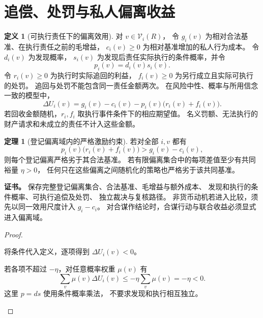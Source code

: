 \documentclass[UTF8,12pt,a4paper,openany,fontset=none,zihao=false]{ctexrep}
\theoremstyle{definition}
\newtheorem{definition}{定义}[chapter]
\newtheorem{theorem}{定理}[chapter]
\newenvironment{certificate}{\par\noindent\textbf{证书。}\ignorespaces}{\par}
\newcommand{\1}{\mathbf 1}
\begin{document}
\section{追偿、处罚与私人偏离收益}

\begin{definition}[可执行责任下的偏离效用]
\label{inc:def-utility}
对 \(v\in\mathcal V_i(R)\)，
令 \(g_i(v)\) 为相对合法基准、在执行责任之前的毛增益，
\(c_i(v)\ge0\) 为相对基准增加的私人行为成本。
令 \(d_i(v)\) 为发现概率，
\(s_i(v)\) 为发现后责任实际执行的条件概率，并令
\[
 p_i(v)=d_i(v)s_i(v).
\]
令 \(r_i(v)\ge0\) 为执行时实际追回的利益，
\(f_i(v)\ge0\) 为另行成立且实际可执行的处罚。
追回与处罚不能包含同一责任金额两次。
在风险中性、概率与所用信念一致的模型中，
\[
 \Delta U_i(v)
 =g_i(v)-c_i(v)-p_i(v)\bigl(r_i(v)+f_i(v)\bigr).
\]
若回收金额随机，\(r_i,f_i\) 取执行事件条件下的相应期望值。
名义罚额、无法执行的财产请求和未成立的责任不计入这些金额。
\end{definition}

\begin{theorem}[登记偏离域内的严格激励约束]
\label{inc:thm-deterrence}
若对全部 \(i,v\) 都有
\[
 p_i(v)\bigl(r_i(v)+f_i(v)\bigr)
 >g_i(v)-c_i(v),
\]
则每个登记偏离严格劣于其合法基准。
若有限偏离集合中的每项差值至少有共同裕量 \(\eta>0\)，
任何只在这些偏离之间随机化的策略也严格劣于该共同基准。
\end{theorem}
\begin{certificate}
保存完整登记偏离集合、合法基准、毛增益与额外成本、
发现和执行的条件概率、可执行追偿及处罚、
独立裁决与复核路径。
非货币动机若进入比较，须先以同一效用尺度计入 \(g_i-c_i\)。
对合谋作结论时，合谋行动与联合收益必须显式进入偏离域。
\end{certificate}
\begin{proof}
\begin{semanticsteps}
\item 将条件代入定义，逐项得到 \(\Delta U_i(v)<0\)。
\item 若各项不超过 \(-\eta\)，对任意概率权重 \(\mu(v)\)
有
\[
 \sum_v\mu(v)\Delta U_i(v)
 \le-\eta\sum_v\mu(v)=-\eta<0.
\]
这里 \(p=ds\) 使用条件概率乘法，
不要求发现和执行相互独立。
\end{semanticsteps}
\end{proof}
\end{document}
